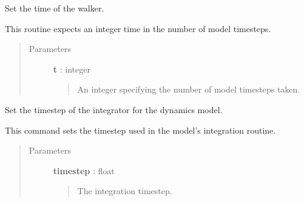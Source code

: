 \documentclass[letterpaper,10pt,english]{sphinxmanual}
\begin{document}
\begin{fulllineitems}
\begin{fulllineitems}
\begin{quote}
\begin{description}
\end{description}\end{quote}

\end{fulllineitems}


\begin{fulllineitems}
\label{walker_api/walker_api.doc:walker_api.lammps_walker.Lammps.set_time}
Set the time of the walker.

This routine expects an integer time in the number of model timesteps.
\begin{quote}\begin{description}
\item[{Parameters}] \leavevmode
\textbf{t} : integer
\begin{quote}

An integer specifying the number of model timesteps taken.
\end{quote}

\end{description}\end{quote}

\end{fulllineitems}


\begin{fulllineitems}
\label{walker_api/walker_api.doc:walker_api.lammps_walker.Lammps.set_timestep}
Set the timestep of the integrator for the dynamics model.

This command sets the timestep used in the model's integration routine.
\begin{quote}\begin{description}
\item[{Parameters}] \leavevmode
\textbf{timestep} : float
\begin{quote}

The integration timestep.
\end{quote}

\end{description}\end{quote}

\end{fulllineitems}



\end{fulllineitems}
\end{document}
